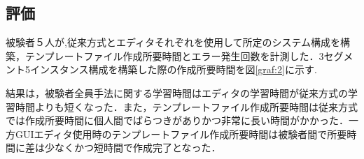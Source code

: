 \documentclass[a4j]{jarticle}
\begin{document}
\begin{Abstract}
 \section{評価}
 被験者５人が,従来方式とエディタそれぞれを使用して所定のシステム構成を構築，テンプレートファイル作成所要時間とエラー発生回数を計測した．3セグメント5インスタンス構成を構築した際の作成所要時間を図\ref{graf:2}に示す.
 
 結果は，被験者全員手法に関する学習時間はエディタの学習時間が従来方式の学習時間よりも短くなった．また，テンプレートファイル作成所要時間は従来方式では作成所要時間に個人間でばらつきがありかつ非常に長い時間がかかった．一方GUIエディタ使用時のテンプレートファイル作成所要時間は被験者間で所要時間に差は少なくかつ短時間で作成完了となった．
 

\end{Abstract}
\end{document}
